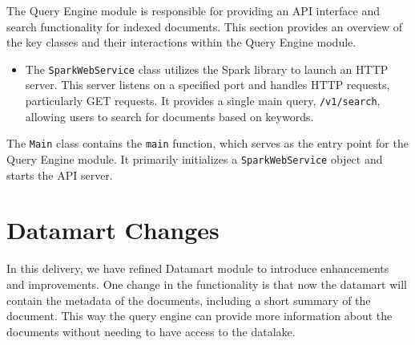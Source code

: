 \documentclass{article}
\begin{document}
The Query Engine module is responsible for providing an API interface and search functionality for indexed documents.
This section provides an overview of the key classes and their interactions within the Query Engine module.

\begin{itemize}
\item
The \texttt{SparkWebService} class utilizes the Spark library to launch an HTTP server. This server listens on a specified port and handles HTTP requests, particularly GET requests. It provides a single main query, \texttt{/v1/search}, allowing users to search for documents based on keywords.
\end{itemize}


The \texttt{Main} class contains the \texttt{main} function, which serves as the entry point for the Query Engine module.
It primarily initializes a \texttt{SparkWebService} object and starts the API server.

\section{Datamart Changes}

In this delivery, we have refined Datamart module to introduce enhancements and improvements.
One change in the functionality is that now the datamart will contain the metadata of the documents, including a short summary of the document.
This way the query engine can provide more information about the documents without needing to have access to the datalake.
\end{document}
